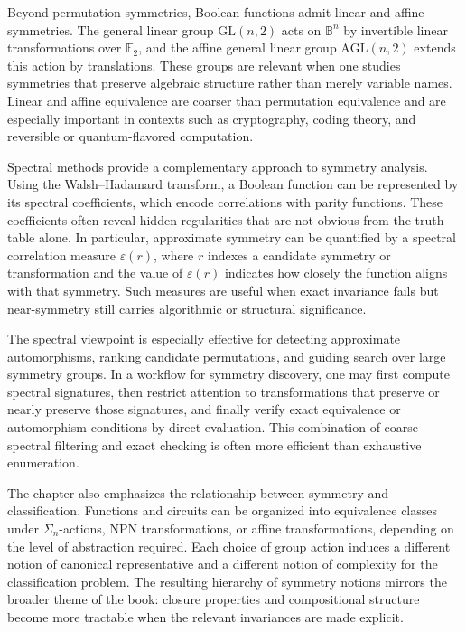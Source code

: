 \documentclass[11pt]{article}
\begin{document}
Beyond permutation symmetries, Boolean functions admit linear and affine symmetries. The general linear group \(\mathrm{GL}(n,2)\) acts on \(\mathbb{B}^n\) by invertible linear transformations over \(\mathbb{F}_2\), and the affine general linear group \(\mathrm{AGL}(n,2)\) extends this action by translations. These groups are relevant when one studies symmetries that preserve algebraic structure rather than merely variable names. Linear and affine equivalence are coarser than permutation equivalence and are especially important in contexts such as cryptography, coding theory, and reversible or quantum-flavored computation.

Spectral methods provide a complementary approach to symmetry analysis. Using the Walsh--Hadamard transform, a Boolean function can be represented by its spectral coefficients, which encode correlations with parity functions. These coefficients often reveal hidden regularities that are not obvious from the truth table alone. In particular, approximate symmetry can be quantified by a spectral correlation measure \(\varepsilon(r)\), where \(r\) indexes a candidate symmetry or transformation and the value of \(\varepsilon(r)\) indicates how closely the function aligns with that symmetry. Such measures are useful when exact invariance fails but near-symmetry still carries algorithmic or structural significance.

The spectral viewpoint is especially effective for detecting approximate automorphisms, ranking candidate permutations, and guiding search over large symmetry groups. In a workflow for symmetry discovery, one may first compute spectral signatures, then restrict attention to transformations that preserve or nearly preserve those signatures, and finally verify exact equivalence or automorphism conditions by direct evaluation. This combination of coarse spectral filtering and exact checking is often more efficient than exhaustive enumeration.

The chapter also emphasizes the relationship between symmetry and classification. Functions and circuits can be organized into equivalence classes under \(\Sigma_n\)-actions, NPN transformations, or affine transformations, depending on the level of abstraction required. Each choice of group action induces a different notion of canonical representative and a different notion of complexity for the classification problem. The resulting hierarchy of symmetry notions mirrors the broader theme of the book: closure properties and compositional structure become more tractable when the relevant invariances are made explicit.
\end{document}
